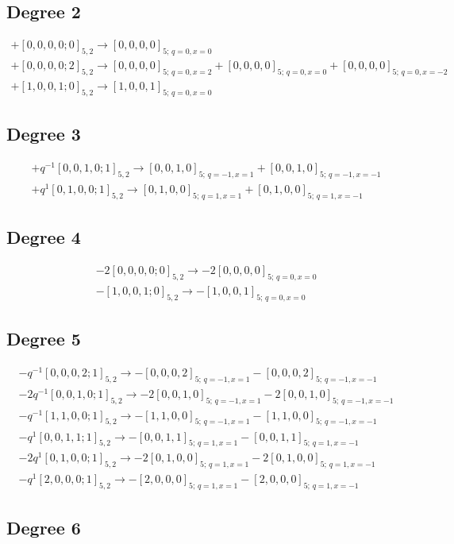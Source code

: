 \documentclass{article}
\begin{document}
\subsection*{Degree 2}
\[\begin{gathered} +[0,0,0,0;0]_{5,2}\longrightarrow [0,0,0,0]_{5;\,q=0,x=0}\\+[0,0,0,0;2]_{5,2}\longrightarrow [0,0,0,0]_{5;\,q=0,x=2} +[0,0,0,0]_{5;\,q=0,x=0} +[0,0,0,0]_{5;\,q=0,x=-2}\\+[1,0,0,1;0]_{5,2}\longrightarrow [1,0,0,1]_{5;\,q=0,x=0}\end{gathered}\]\subsection*{Degree 3}
\[\begin{gathered} +q^{-1}[0,0,1,0;1]_{5,2}\longrightarrow [0,0,1,0]_{5;\,q=-1,x=1} +[0,0,1,0]_{5;\,q=-1,x=-1}\\+q^{1}[0,1,0,0;1]_{5,2}\longrightarrow [0,1,0,0]_{5;\,q=1,x=1} +[0,1,0,0]_{5;\,q=1,x=-1}\end{gathered}\]\subsection*{Degree 4}
\[\begin{gathered} -2[0,0,0,0;0]_{5,2}\longrightarrow -2[0,0,0,0]_{5;\,q=0,x=0}\\-[1,0,0,1;0]_{5,2}\longrightarrow -[1,0,0,1]_{5;\,q=0,x=0}\end{gathered}\]\subsection*{Degree 5}
\[\begin{gathered} -q^{-1}[0,0,0,2;1]_{5,2}\longrightarrow -[0,0,0,2]_{5;\,q=-1,x=1} -[0,0,0,2]_{5;\,q=-1,x=-1}\\-2q^{-1}[0,0,1,0;1]_{5,2}\longrightarrow -2[0,0,1,0]_{5;\,q=-1,x=1} -2[0,0,1,0]_{5;\,q=-1,x=-1}\\-q^{-1}[1,1,0,0;1]_{5,2}\longrightarrow -[1,1,0,0]_{5;\,q=-1,x=1} -[1,1,0,0]_{5;\,q=-1,x=-1}\\-q^{1}[0,0,1,1;1]_{5,2}\longrightarrow -[0,0,1,1]_{5;\,q=1,x=1} -[0,0,1,1]_{5;\,q=1,x=-1}\\-2q^{1}[0,1,0,0;1]_{5,2}\longrightarrow -2[0,1,0,0]_{5;\,q=1,x=1} -2[0,1,0,0]_{5;\,q=1,x=-1}\\-q^{1}[2,0,0,0;1]_{5,2}\longrightarrow -[2,0,0,0]_{5;\,q=1,x=1} -[2,0,0,0]_{5;\,q=1,x=-1}\end{gathered}\]\subsection*{Degree 6}
\end{document}
